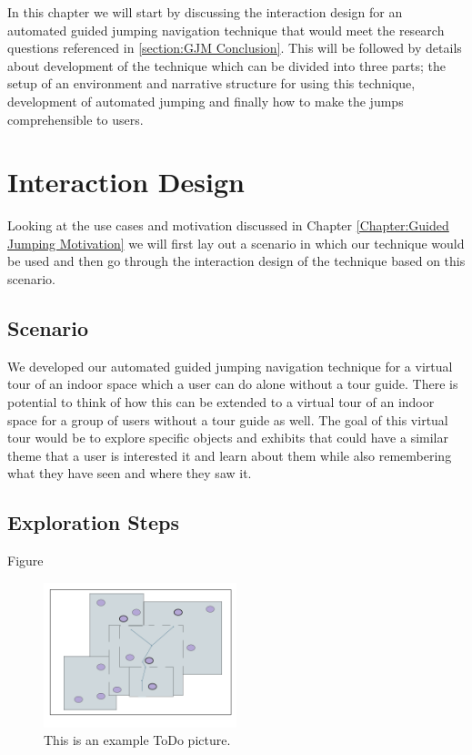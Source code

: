 \label{Chapter:Automated Guided Jumping for Navigation}
In this chapter we will start by discussing the interaction design for an automated guided jumping navigation technique that would meet the research questions referenced in \ref{section:GJM Conclusion}. This will be followed by details about development of the technique which can be divided into three parts; the setup of an environment and narrative structure for using this technique, development of automated jumping and finally how to make the jumps comprehensible to users. 

\section{Interaction Design}
\label{section AGJN: Interaction Design}
Looking at the use cases and motivation discussed in Chapter \ref{Chapter:Guided Jumping Motivation} we will first lay out a scenario in which our technique would be used and then go through the interaction design of the technique based on this scenario.
\subsection{Scenario}
\label{subsection AGJN ID: Scenario}
We developed our automated guided jumping navigation technique  for a virtual tour of an indoor space which a user can do alone without a tour guide. There is potential to think of how this can be extended to a virtual tour of an indoor space for a group of users without a tour guide as well. The goal of this virtual tour would be to explore specific objects and exhibits that could have a similar theme that a user is interested it and learn about them while also remembering what they have seen and where they saw it. 
\subsection{Exploration Steps}
Figure 
%
\begin{figure}[]
  \centering
  \includegraphics[width=0.5\textwidth]{images/interaction-design-layout.png}
  \caption{This is an example ToDo picture.}
  \label{fig:interaction-design-layout}
\end{figure}

